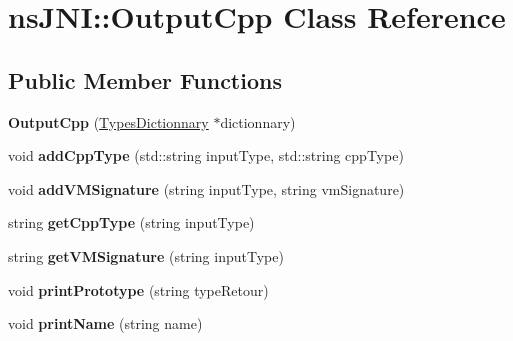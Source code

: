 \hypertarget{classnsJNI_1_1OutputCpp}{\section{ns\-J\-N\-I\-:\-:\-Output\-Cpp \-Class \-Reference}
\label{classnsJNI_1_1OutputCpp}
}
\subsection*{\-Public \-Member \-Functions}
\begin{DoxyCompactItemize}
\item 
\hypertarget{classnsJNI_1_1OutputCpp_a2e5f3c32862b9ce03a1685e8a76587c1}{{\bfseries \-Output\-Cpp} (\hyperlink{classnsJNI_1_1TypesDictionnary}{\-Types\-Dictionnary} $\ast$dictionnary)}\label{classnsJNI_1_1OutputCpp_a2e5f3c32862b9ce03a1685e8a76587c1}

\item 
\hypertarget{classnsJNI_1_1OutputCpp_a53ccac4d49ee948a4008cf8200fe1699}{void {\bfseries add\-Cpp\-Type} (std\-::string input\-Type, std\-::string cpp\-Type)}\label{classnsJNI_1_1OutputCpp_a53ccac4d49ee948a4008cf8200fe1699}

\item 
\hypertarget{classnsJNI_1_1OutputCpp_ae99bab82b054ca456ce73837232def4e}{void {\bfseries add\-V\-M\-Signature} (string input\-Type, string vm\-Signature)}\label{classnsJNI_1_1OutputCpp_ae99bab82b054ca456ce73837232def4e}

\item 
\hypertarget{classnsJNI_1_1OutputCpp_a55d4f55824ff222bf2afb65fa8ff81dc}{string {\bfseries get\-Cpp\-Type} (string input\-Type)}\label{classnsJNI_1_1OutputCpp_a55d4f55824ff222bf2afb65fa8ff81dc}

\item 
\hypertarget{classnsJNI_1_1OutputCpp_a2ede0341ccda09702269d5c76243d6d2}{string {\bfseries get\-V\-M\-Signature} (string input\-Type)}\label{classnsJNI_1_1OutputCpp_a2ede0341ccda09702269d5c76243d6d2}

\item 
\hypertarget{classnsJNI_1_1OutputCpp_a68973deca8c08df39768ed622fcbd20c}{void {\bfseries print\-Prototype} (string type\-Retour)}\label{classnsJNI_1_1OutputCpp_a68973deca8c08df39768ed622fcbd20c}

\item 
\hypertarget{classnsJNI_1_1OutputCpp_a619b328bdd4eb308eddc84b6638e5ef8}{void {\bfseries print\-Name} (string name)}\label{classnsJNI_1_1OutputCpp_a619b328bdd4eb308eddc84b6638e5ef8}


\end{DoxyCompactItemize}
